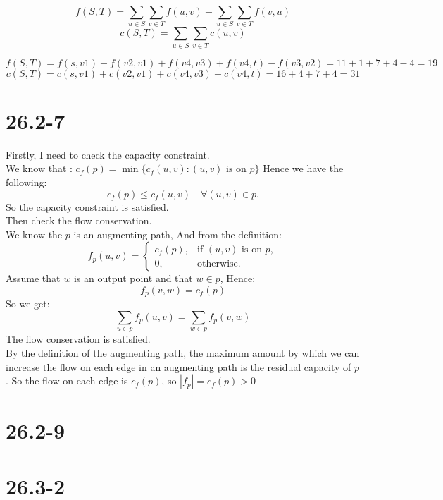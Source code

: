 \documentclass[12pt]{article}
\begin{document}
\[f(S, T) = \sum_{u \in S} \sum_{v \in T} f(u, v) - \sum_{u \in S} \sum_{v \in T} f(v, u)\]
\[c(S, T) = \sum_{u \in S} \sum_{v \in T} c(u, v)\]

\[f(S, T) = f(s,v1)+f(v2,v1)+f(v4,v3)+f(v4,t) - f(v3,v2) = 11+1+7+4-4=19\]
\[c(S, T) = c(s,v1)+c(v2,v1)+c(v4,v3)+c(v4,t)=16+4+7+4=31\]
\section{26.2-7}
Firstly, I need to check the capacity constraint.\\
We know that : \(c_f(p) = \min \{ c_f(u, v) : (u, v) \text{ is on } p \}\)
Hence we have the following:
\[c_f(p) \leq c_f(u, v) \quad \forall (u, v) \in p.\]
So the capacity constraint is satisfied.\\
Then check the flow conservation.\\
We know the \(p\) is an augmenting path, And from the definition:
\[f_p(u, v) =
\begin{cases} 
c_f(p), & \text{if } (u, v) \text{ is on } p, \\ 
0, & \text{otherwise}.
\end{cases}\]
Assume that \(w\) is an output point and that \(w \in p\), Hence:
\[f_p(v, w) = c_f(p)\]
So we get: 
\[\sum_{u \in p} f_p(u, v) =\sum_{w \in p} f_p(v, w)\]
The flow conservation is satisfied.\\
By the definition of the augmenting path, the maximum amount by which we can increase the flow on each edge in an augmenting path is the residual capacity of \(p\).
So the flow on each edge is \(c_f(p)\), so \( |f_p| = c_f(p) > 0\)
\section{26.2-9}
\section{26.3-2}
\end{document}
